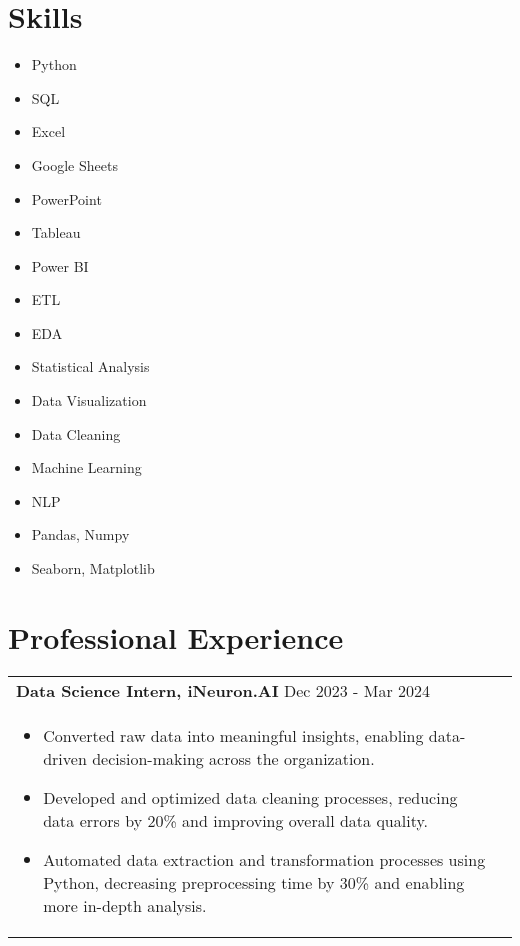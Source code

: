 \documentclass[a4paper,10pt]{article}
\begin{document}
\section{Skills}
\begin{multicols}{4}
\begin{itemize}
    \item Python
    \item SQL
    \item Excel
    \item Google Sheets
    \item PowerPoint
    \item Tableau
    \item Power BI
    \item ETL
    \item EDA
    \item Statistical Analysis
    \item Data Visualization
    \item Data Cleaning
    \item Machine Learning
    \item NLP
    \item Pandas, Numpy
    \item Seaborn, Matplotlib
\end{itemize}
\end{multicols}


\section{Professional Experience}
\begin{tabularx}{\linewidth}{ @{}l r@{} }
\textbf {Data Science Intern, iNeuron.AI} \hfill Dec 2023 - Mar 2024 \\[4pt]
\begin{minipage}[t]{\linewidth}
    \begin{itemize}[nosep,after=\strut, leftmargin=2em, itemsep=2pt]
        \item Converted raw data into meaningful insights, enabling data-driven decision-making across the organization.
        \item Developed and optimized data cleaning processes, reducing data errors by 20\% and improving overall data quality.
        \item Automated data extraction and transformation processes using Python, decreasing preprocessing time by 30\% and enabling more in-depth analysis.
    \end{itemize}
\end{minipage}
\end{tabularx}
\end{document}
